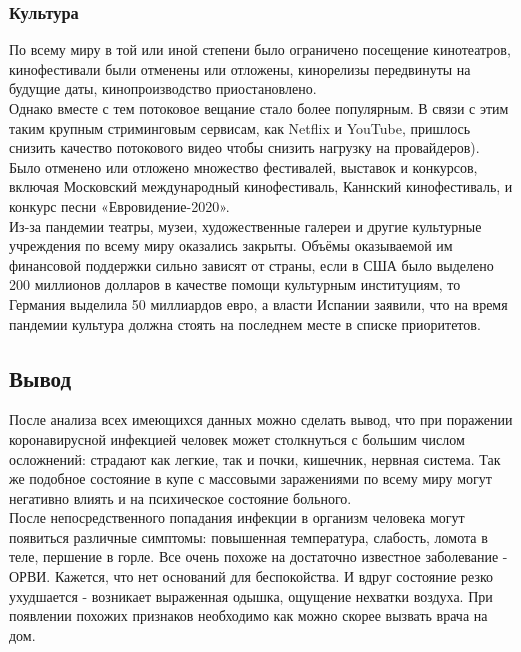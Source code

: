 \documentclass[a4paper, 12pt]{extarticle}
\begin{document}
\subsubsection{Культура}
По всему миру в той или иной степени было ограничено посещение кинотеатров, кинофестивали были отменены или отложены, кинорелизы передвинуты на будущие даты, кинопроизводство приостановлено.
\\

Однако вместе с тем потоковое вещание стало более популярным. В связи с этим таким крупным стриминговым сервисам, как Netflix и YouTube, пришлось снизить качество потокового видео чтобы снизить нагрузку на провайдеров).
\\

Было отменено или отложено множество фестивалей, выставок и конкурсов, включая Московский международный кинофестиваль, Каннский кинофестиваль, и конкурс песни «Евровидение-2020».
\\

Из-за пандемии театры, музеи, художественные галереи и другие культурные учреждения по всему миру оказались закрыты. Объёмы оказываемой им финансовой поддержки сильно зависят от страны, если в США было выделено 200 миллионов долларов в качестве помощи культурным институциям, то Германия выделила 50 миллиардов евро, а власти Испании заявили, что на время пандемии культура должна стоять на последнем месте в списке приоритетов.
\newpage

\subsection{Вывод}
После анализа всех имеющихся данных можно сделать вывод, что при поражении коронавирусной инфекцией человек может столкнуться с большим числом осложнений: страдают как легкие, так и почки, кишечник, нервная система. Так же подобное состояние в купе с массовыми заражениями по всему миру могут негативно влиять и на психическое состояние больного.
\\

После непосредственного попадания инфекции в организм человека могут появиться различные симптомы: повышенная температура, слабость, ломота в теле, першение в горле.  Все очень похоже на достаточно известное заболевание - ОРВИ. Кажется, что нет оснований для беспокойства. И вдруг состояние резко ухудшается - возникает выраженная одышка, ощущение нехватки воздуха. При появлении похожих признаков необходимо как можно скорее вызвать врача на дом.
\\
\end{document}
